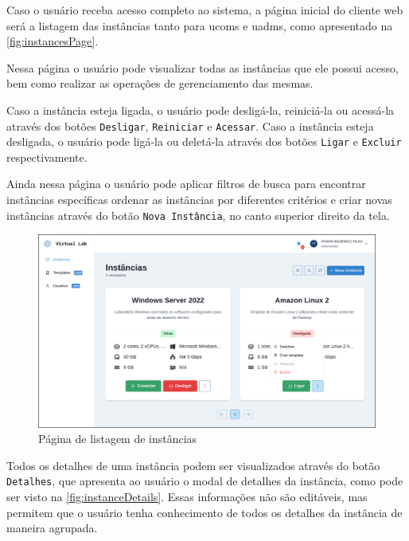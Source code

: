 Caso o usuário receba acesso completo ao sistema, a página inicial do cliente web será a listagem das instâncias tanto para \glspl{ucom} e \glspl{uadm}, como apresentado na \autoref{fig:instancesPage}.

Nessa página o usuário pode visualizar todas as instâncias que ele possui acesso, bem como realizar as operações de gerenciamento das mesmas.

Caso a instância esteja ligada, o usuário pode desligá-la, reiniciá-la ou acessá-la através dos botões \texttt{Desligar}, \texttt{Reiniciar} e \texttt{Acessar}. Caso a instância esteja desligada, o usuário pode ligá-la ou deletá-la através dos botões \texttt{Ligar} e \texttt{Excluir} respectivamente. 

Ainda nessa página o usuário pode aplicar filtros de busca para encontrar instâncias específicas ordenar as instâncias por diferentes critérios e criar novas instâncias através do botão \texttt{Nova Instância}, no canto superior direito da tela.

\begin{figure}[H]
\caption{Página de listagem de instâncias}
\label{fig:instancesPage}
\includegraphics[width=\textwidth]{capitulos/3-resultados/files/instances.png}
\end{figure}

Todos os detalhes de uma instância podem ser visualizados através do botão \texttt{Detalhes}, que apresenta ao usuário o modal de detalhes da instância, como pode ser visto na \autoref{fig:instanceDetails}. Essas informações não são editáveis, mas permitem que o usuário tenha conhecimento de todos os detalhes da instância de maneira agrupada.

